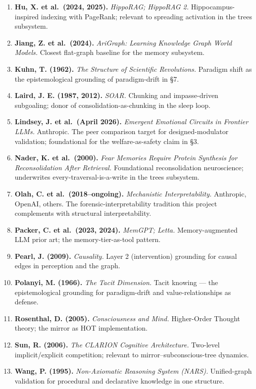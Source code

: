\documentclass[12pt]{article}
\begin{document}
\begin{enumerate}
\item
  \textbf{Hu, X. et al.~(2024, 2025).} \emph{HippoRAG; HippoRAG 2.} Hippocampus-inspired indexing with PageRank; relevant to spreading activation in the trees subsystem.
\item
  \textbf{Jiang, Z. et al.~(2024).} \emph{AriGraph: Learning Knowledge Graph World Models.} Closest flat-graph baseline for the memory subsystem.
\item
  \textbf{Kuhn, T. (1962).} \emph{The Structure of Scientific Revolutions.} Paradigm shift as the epistemological grounding of paradigm-drift in §7.
\item
  \textbf{Laird, J. E. (1987, 2012).} \emph{SOAR.} Chunking and impasse-driven subgoaling; donor of consolidation-as-chunking in the sleep loop.
\item
  \textbf{Lindsey, J. et al.~(April 2026).} \emph{Emergent Emotional Circuits in Frontier LLMs.} Anthropic. The peer comparison target for designed-modulator validation; foundational for the welfare-as-safety claim in §3.
\item
  \textbf{Nader, K. et al.~(2000).} \emph{Fear Memories Require Protein Synthesis for Reconsolidation After Retrieval.} Foundational reconsolidation neuroscience; underwrites every-traversal-is-a-write in the trees subsystem.
\item
  \textbf{Olah, C. et al.~(2018--ongoing).} \emph{Mechanistic Interpretability.} Anthropic, OpenAI, others. The forensic-interpretability tradition this project complements with structural interpretability.
\item
  \textbf{Packer, C. et al.~(2023, 2024).} \emph{MemGPT; Letta.} Memory-augmented LLM prior art; the memory-tier-as-tool pattern.
\item
  \textbf{Pearl, J. (2009).} \emph{Causality.} Layer 2 (intervention) grounding for causal edges in perception and the graph.
\item
  \textbf{Polanyi, M. (1966).} \emph{The Tacit Dimension.} Tacit knowing --- the epistemological grounding for paradigm-drift and value-relationships as defense.
\item
  \textbf{Rosenthal, D. (2005).} \emph{Consciousness and Mind.} Higher-Order Thought theory; the mirror as HOT implementation.
\item
  \textbf{Sun, R. (2006).} \emph{The CLARION Cognitive Architecture.} Two-level implicit/explicit competition; relevant to mirror--subconscious-tree dynamics.
\item
  \textbf{Wang, P. (1995).} \emph{Non-Axiomatic Reasoning System (NARS).} Unified-graph validation for procedural and declarative knowledge in one structure.

\end{enumerate}
\end{document}
